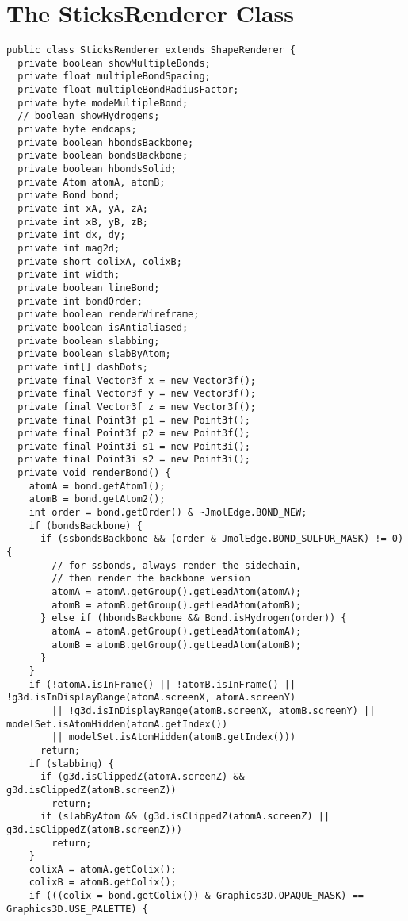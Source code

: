 \chapter{The SticksRenderer Class}\label{ap:SticksRenderer}
\begin{lstlisting}[caption={}, label = {code:jmol:SticksRenderer}] 
public class SticksRenderer extends ShapeRenderer {
  private boolean showMultipleBonds;
  private float multipleBondSpacing;
  private float multipleBondRadiusFactor;
  private byte modeMultipleBond;
  // boolean showHydrogens;
  private byte endcaps;
  private boolean hbondsBackbone;
  private boolean bondsBackbone;
  private boolean hbondsSolid;
  private Atom atomA, atomB;
  private Bond bond;
  private int xA, yA, zA;
  private int xB, yB, zB;
  private int dx, dy;
  private int mag2d;
  private short colixA, colixB;
  private int width;
  private boolean lineBond;
  private int bondOrder;
  private boolean renderWireframe;
  private boolean isAntialiased;
  private boolean slabbing;
  private boolean slabByAtom;
  private int[] dashDots;
  private final Vector3f x = new Vector3f();
  private final Vector3f y = new Vector3f();
  private final Vector3f z = new Vector3f();
  private final Point3f p1 = new Point3f();
  private final Point3f p2 = new Point3f();
  private final Point3i s1 = new Point3i();
  private final Point3i s2 = new Point3i();
  private void renderBond() {
    atomA = bond.getAtom1();
    atomB = bond.getAtom2();
    int order = bond.getOrder() & ~JmolEdge.BOND_NEW;
    if (bondsBackbone) {
      if (ssbondsBackbone && (order & JmolEdge.BOND_SULFUR_MASK) != 0) {
        // for ssbonds, always render the sidechain,
        // then render the backbone version
        atomA = atomA.getGroup().getLeadAtom(atomA);
        atomB = atomB.getGroup().getLeadAtom(atomB);
      } else if (hbondsBackbone && Bond.isHydrogen(order)) {
        atomA = atomA.getGroup().getLeadAtom(atomA);
        atomB = atomB.getGroup().getLeadAtom(atomB);
      }
    }
    if (!atomA.isInFrame() || !atomB.isInFrame() || !g3d.isInDisplayRange(atomA.screenX, atomA.screenY)
        || !g3d.isInDisplayRange(atomB.screenX, atomB.screenY) || modelSet.isAtomHidden(atomA.getIndex())
        || modelSet.isAtomHidden(atomB.getIndex()))
      return;
    if (slabbing) {
      if (g3d.isClippedZ(atomA.screenZ) && g3d.isClippedZ(atomB.screenZ))
        return;
      if (slabByAtom && (g3d.isClippedZ(atomA.screenZ) || g3d.isClippedZ(atomB.screenZ)))
        return;
    }
    colixA = atomA.getColix();
    colixB = atomB.getColix();
    if (((colix = bond.getColix()) & Graphics3D.OPAQUE_MASK) == Graphics3D.USE_PALETTE) {

\end{lstlisting}
